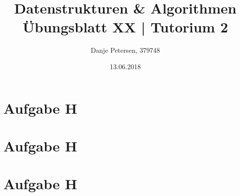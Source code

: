 \documentclass[a4paper,graphics,14pt]{article}
\author		{ \Large Danje Petersen, 379748}
\title{ \Huge Datenstrukturen \& Algorithmen \\
		\huge Übungsblatt XX | Tutorium 2}
\date{13.06.2018}
\newcommand{\aufgabe}[1]{\section*{Aufgabe #1}}
\begin{document}
\doublespacing
\maketitle
\onehalfspacing

\aufgabe{H}



\aufgabe{H}



\aufgabe{H}
\end{document}

